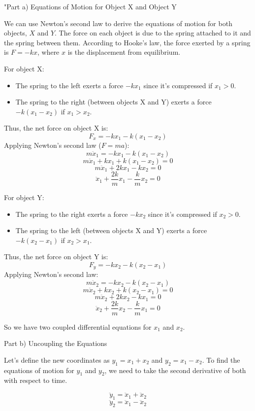 "Part a) Equations of Motion for Object X and Object Y

We can use Newton's second law to derive the equations of motion for both objects, \(X\) and \(Y\). The force on each object is due to the spring attached to it and the spring between them. According to Hooke's law, the force exerted by a spring is \( F = -kx \), where \( x \) is the displacement from equilibrium.

For object X:

\begin{itemize}
  \item The spring to the left exerts a force \( -kx_1 \) since it's compressed if \( x_1 > 0 \).
  \item The spring to the right (between objects X and Y) exerts a force \( -k(x_1 - x_2) \) if \( x_1 > x_2 \).
\end{itemize}

Thus, the net force on object X is:
\[ F_x = -kx_1 - k(x_1 - x_2) \]
Applying Newton's second law (\( F = ma \)):
\[ m\ddot{x}_1 = -kx_1 - k(x_1 - x_2) \]
\[ m\ddot{x}_1 + kx_1 + k(x_1 - x_2) = 0 \]
\[ m\ddot{x}_1 + 2kx_1 - kx_2 = 0 \]
\[ \ddot{x}_1 + \frac{2k}{m}x_1 - \frac{k}{m}x_2 = 0 \]

For object Y:

\begin{itemize}
  \item The spring to the right exerts a force \( -kx_2 \) since it's compressed if \( x_2 > 0 \).
  \item The spring to the left (between objects X and Y) exerts a force \( -k(x_2 - x_1) \) if \( x_2 > x_1 \).
\end{itemize}

Thus, the net force on object Y is:
\[ F_y = -kx_2 - k(x_2 - x_1) \]
Applying Newton's second law:
\[ m\ddot{x}_2 = -kx_2 - k(x_2 - x_1) \]
\[ m\ddot{x}_2 + kx_2 + k(x_2 - x_1) = 0 \]
\[ m\ddot{x}_2 + 2kx_2 - kx_1 = 0 \]
\[ \ddot{x}_2 + \frac{2k}{m}x_2 - \frac{k}{m}x_1 = 0 \]

So we have two coupled differential equations for \( x_1 \) and \( x_2 \).

Part b) Uncoupling the Equations

Let's define the new coordinates as \( y_1 = x_1 + x_2 \) and \( y_2 = x_1 - x_2 \). To find the equations of motion for \( y_1 \) and \( y_2 \), we need to take the second derivative of both with respect to time.

\[ \ddot{y}_1 = \ddot{x}_1 + \ddot{x}_2 \]
\[ \ddot{y}_2 = \ddot{x}_1 - \ddot{x}_2 \]

